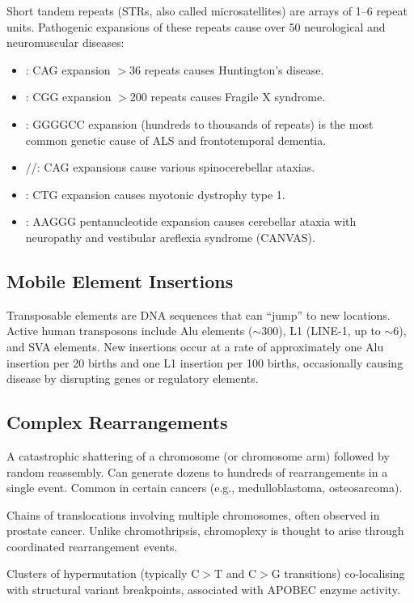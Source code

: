 Short tandem repeats (STRs, also called microsatellites) are arrays of 1--6\basepair{} repeat units. Pathogenic expansions of these repeats cause over 50 neurological and neuromuscular diseases:

\begin{itemize}[nosep]
  \item {}: CAG expansion $>$36 repeats causes Huntington's disease.
  \item {}: CGG expansion $>$200 repeats causes Fragile X syndrome.
  \item {}: GGGGCC expansion (hundreds to thousands of repeats) is the most common genetic cause of ALS and frontotemporal dementia.
  \item {}//: CAG expansions cause various spinocerebellar ataxias.
  \item {}: CTG expansion causes myotonic dystrophy type 1.
  \item {}: AAGGG pentanucleotide expansion causes cerebellar ataxia with neuropathy and vestibular areflexia syndrome (CANVAS).
\end{itemize}

\subsection{Mobile Element Insertions}

Transposable elements are DNA sequences that can ``jump'' to new locations. Active human transposons include Alu elements ($\sim$300\basepair{}), L1 (LINE-1, up to $\sim$6\kilobase{}), and SVA elements. New insertions occur at a rate of approximately one Alu insertion per 20 births and one L1 insertion per 100 births, occasionally causing disease by disrupting genes or regulatory elements.

\subsection{Complex Rearrangements}

\begin{description}[style=nextline]
  \item[Chromothripsis] A catastrophic shattering of a chromosome (or chromosome arm) followed by random reassembly. Can generate dozens to hundreds of rearrangements in a single event. Common in certain cancers (e.g., medulloblastoma, osteosarcoma).
  \item[Chromoplexy] Chains of translocations involving multiple chromosomes, often observed in prostate cancer. Unlike chromothripsis, chromoplexy is thought to arise through coordinated rearrangement events.
  \item[Kataegis] Clusters of hypermutation (typically C$>$T and C$>$G transitions) co-localising with structural variant breakpoints, associated with APOBEC enzyme activity.
\end{description}

